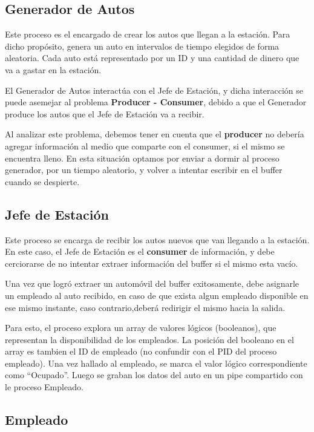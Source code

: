 \documentclass[12pt,a4paper,spanish]{article}
\begin{document}
	\subsection{Generador de Autos}
		
		Este proceso es el encargado de crear los autos que llegan a la estación. Para
		dicho propósito, genera un auto en intervalos de tiempo elegidos de forma aleatoria. 
		Cada auto está representado por un ID y una cantidad de dinero que va a gastar en la estación.

		El Generador de Autos interactúa con el Jefe de Estación, y dicha interacción se puede
		asemejar al problema \textbf{Producer - Consumer}, debido a que el Generador produce
		los autos que el Jefe de Estación va a recibir. 

		Al analizar este problema, debemos tener en cuenta que el \textbf{producer} no debería
		agregar información al medio que comparte con el consumer, si el mismo se encuentra lleno.
		En esta situación optamos por enviar a dormir al proceso generador, por un tiempo
		aleatorio, y volver a intentar escribir en el buffer cuando se despierte.

	\subsection{Jefe de Estación}
		Este proceso se encarga de recibir los autos nuevos que van llegando a la estación. 
		En este caso, el Jefe de Estación es el \textbf{consumer} de información, y debe
		cerciorarse de no intentar extraer información del buffer si el mismo esta vacío.

		Una vez que logró extraer un automóvil del buffer exitosamente, debe asignarle 
		un empleado al auto recibido, en caso de que exista algun empleado disponible 
		en ese mismo instante, caso contrario,deberá redirigir el mismo hacia la salida.
		
		Para esto, el proceso explora un array de valores lógicos (booleanos), que representan la disponibilidad de los empleados. La posición del booleano en el array es tambien el ID de empleado (no confundir con el PID del proceso empleado). Una vez hallado al empleado, se marca el valor lógico correspondiente como ``Ocupado''. Luego se graban los datos del auto en un pipe compartido con le proceso Empleado.

	\subsection{Empleado}
	
\end{document}
